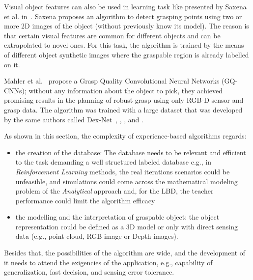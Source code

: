 Visual object features can also be used in learning task like presented by Saxena et al. in~\cite{saxena2008robotic}. Saxena proposes an algorithm to detect grasping points using two or more 2D images of the object (without previously know its model). The reason is that certain visual features are common for different objects and can be extrapolated to novel ones. For this task, the algorithm is trained by the means of different object synthetic images where the graspable region is already labelled on it.  

Mahler et al.~\cite{mahler2017dex} propose a Grasp Quality Convolutional Neural Networks (GQ-CNNs); without any information about the object to pick, they achieved promising results in the planning of robust grasp using only RGB-D sensor  and grasp data. The algorithm was trained with a large dataset that was developed by the same authors called Dex-Net~\cite{mahler2016dex}, \cite{mahler2017dex}, \cite{mahler2018dex}, and \cite{mahler2019learning}.

As shown in this section, the complexity of experience-based algorithms regards: 
\begin{itemize}

\item the creation of the database:  The database needs to be relevant and efficient to the task demanding a well structured labeled database e.g., in \textit{Reinforcement Learning} methods, the real iterations scenarios could be unfeasible, and simulations could come across the mathematical modeling problem of the \textit{Analytical} approach and, for the \ac{LBD}, the teacher performance could limit the algorithm efficacy


\item the modelling and the interpretation of graspable object: the object representation could be defined as a 3D model or only with direct sensing data (e.g., point cloud, RGB image or Depth images). 

\end{itemize}

Besides that, the possibilities of the algorithm are wide, and the development of it needs to attend the exigencies of the application, e.g., capability of generalization, fast decision, and sensing error tolerance.






